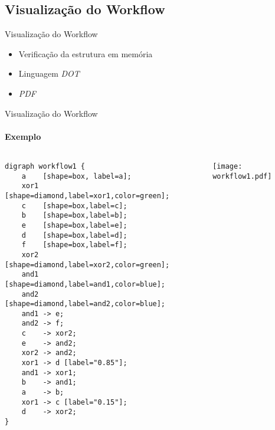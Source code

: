 \documentclass[xcolor=x11names,compress]{beamer}
\renewcommand{\(}{\begin{columns}}
\renewcommand{\)}{\end{columns}}
\newcommand{\<}[1]{\begin{column}{#1}}
\renewcommand{\>}{\end{column}}
\begin{document}
    \subsection{Visualização do Workflow}
        \begin{frame}{Visualização do Workflow}
            \begin{itemize}[<+->]
                \item Verificação da estrutura em memória
                \item Linguagem \emph{DOT}
                \item \emph{PDF}
            \end{itemize}
        \end{frame}

\begin{frame}[fragile]{Visualização do Workflow}
\framesubtitle{Exemplo}
    \begin{columns}[c]
        \begin{column}[l]{5cm}
        \begin{lstlisting}[basicstyle=\tiny]
digraph workflow1 {
    a    [shape=box, label=a];
    xor1 [shape=diamond,label=xor1,color=green];
    c    [shape=box,label=c];
    b    [shape=box,label=b];
    e    [shape=box,label=e];
    d    [shape=box,label=d];
    f    [shape=box,label=f];
    xor2 [shape=diamond,label=xor2,color=green];
    and1 [shape=diamond,label=and1,color=blue];
    and2 [shape=diamond,label=and2,color=blue];
    and1 -> e;
    and2 -> f;
    c    -> xor2;
    e    -> and2;
    xor2 -> and2;
    xor1 -> d [label="0.85"];
    and1 -> xor1;
    b    -> and1;
    a    -> b;
    xor1 -> c [label="0.15"];
    d    -> xor2;
}
        \end{lstlisting}
        \end{column}

        \begin{column}{5cm}
            \hfill
            \texttt{[image: workflow1.pdf]}
        \end{column}
    \end{columns}
\end{frame}
\end{document}
